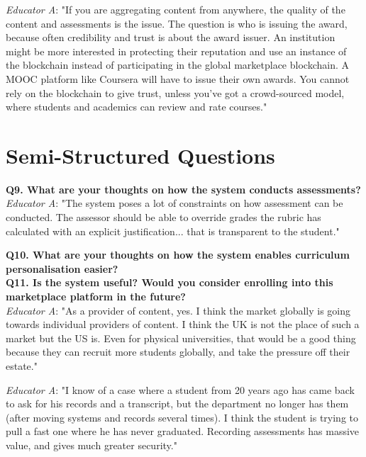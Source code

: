 \textit{Educator A}: "If you are aggregating content from anywhere, 
the quality of the content and assessments is the issue. The question is who is issuing the award, 
because often credibility and trust is about the award issuer. 
An institution might be more interested in protecting their reputation and use an instance of the blockchain 
instead of participating in the global marketplace blockchain. A MOOC platform like Coursera will have to issue 
their own awards. You cannot rely on the blockchain to give trust, unless you've got a crowd-sourced model, 
where students and academics can review and rate courses."\\

\section{Semi-Structured Questions}

\textbf{Q9. What are your thoughts on how the system conducts assessments?}\\

\textit{Educator A}: "The system poses a lot of constraints on how assessment can be conducted. 
The assessor should be able to override grades the rubric has calculated with an explicit justification... 
that is transparent to the student."

\textbf{Q10. What are your thoughts on how the system enables curriculum personalisation easier?}\\

\textbf{Q11. Is the system useful? Would you consider enrolling into this marketplace platform in the future?}\\

\textit{Educator A}: "As a provider of content, yes. I think the market globally is going towards 
individual providers of content. I think the UK is not the place of such a market but the US is. 
Even for physical universities, that would be a good thing because they can recruit more students globally, and 
take the pressure off their estate."

\textit{Educator A}: "I know of a case where a student from 20 years ago has came back to ask for his records 
and a transcript, but the department no longer has them (after moving systems and records several times). 
I think the student is trying to pull a fast one where he has never graduated. Recording assessments has massive value, 
and gives much greater security."